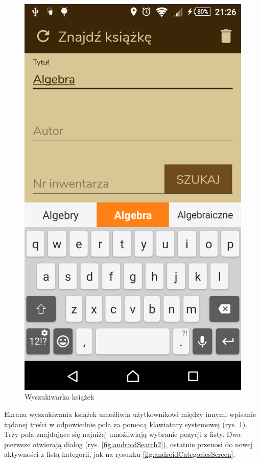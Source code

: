 \documentclass[twoside]{projektInzynierskiMS}
\begin{document}
\begin{figure}[h]
  \centering
  \includegraphics[width=0.4\linewidth]{img/android/android2.PNG}
  \caption{Wyszukiwarka książek}
  \label{fig:searchScreen}
\end{figure}

Ekranu wyszukiwania książek umożliwia użytkownikowi między innymi wpisanie żądanej treści w odpowiednie pola za pomocą klawiatury systemowej (rys. \ref{fig:searchScreen}). Trzy pola znajdujące się najniżej umożliwiają wybranie pozycji z listy. Dwa pierwsze otwierają dialog (rys. \ref{fig:androidSearch2}), ostatnie przenosi do nowej aktywności z listą kategorii, jak na rysunku \ref{fig:androidCategoriesScreen}.
\end{document}

